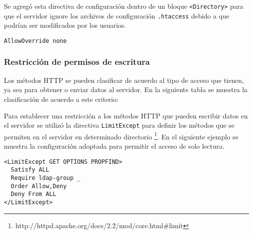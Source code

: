 Se agreg\'{o} esta directiva de configuraci\'{o}n dentro de un bloque \texttt{<Directory>} para que el servidor ignore los archivos de configuraci\'{o}n \texttt{.htaccess} debido a que podr\'{i}an ser modificados por los usuarios.

{
\scriptsize
\linespread{1}
\begin{verbatim}
AllowOverride none
\end{verbatim}
}

        \subsubsection{Restricci\'{o}n de permisos de escritura}

Los m\'{e}todos \textsc{HTTP} se pueden clasificar de acuerdo al tipo de acceso que tienen, ya sea para obtener o enviar datos al servidor. En la siguiente tabla se muestra la clasificaci\'{o}n de acuerdo a este criterio:

{
 \linespread{1}
 \begin{table}[H]
 \caption{Clasificaci\'{o}n de m\'{e}todos \textsc{HTTP}}{}
 \label{tab:http-methods}
 \noindent{} %
 \end{table}
}

Para establecer una restricci\'{o}n a los m\'{e}todos \textsc{HTTP} que pueden escribir datos en el servidor se utiliz\'{o} la directiva \texttt{LimitExcept} para definir los m\'{e}todos que se permiten en el servidor en determinado directorio \footnote{http://httpd.apache.org/docs/2.2/mod/core.html\#limit}. En el siguiente ejemplo se muestra la configuraci\'{o}n adoptada para permitir el acceso de solo lectura.

{
\normalsize
\linespread{1}
\begin{verbatim}
<LimitExcept GET OPTIONS PROPFIND>
  Satisfy ALL
  Require ldap-group _
  Order Allow,Deny
  Deny From ALL
</LimitExcept>
\end{verbatim}
}

